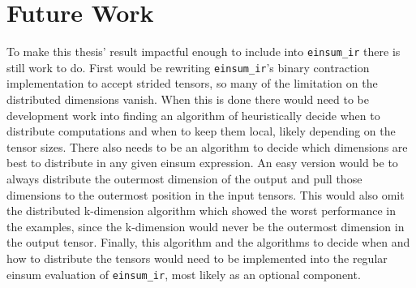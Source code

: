 \section{Future Work}

To make this thesis' result impactful enough to include into \texttt{einsum\_ir} there is still work to do.
First would be rewriting \texttt{einsum\_ir}'s binary contraction implementation to accept strided tensors, so many of the limitation on the distributed dimensions vanish.
When this is done there would need to be development work into finding an algorithm of heuristically decide when to distribute computations and when to keep them local, likely depending on the tensor sizes.
There also needs to be an algorithm to decide which dimensions are best to distribute in any given einsum expression.
An easy version would be to always distribute the outermost dimension of the output and pull those dimensions to the outermost position in the input tensors.
This would also omit the distributed k-dimension algorithm which showed the worst performance in the examples, since the k-dimension would never be the outermost dimension in the output tensor.
Finally, this algorithm and the algorithms to decide when and how to distribute the tensors would need to be implemented into the regular einsum evaluation of \texttt{einsum\_ir}, most likely as an optional component.
